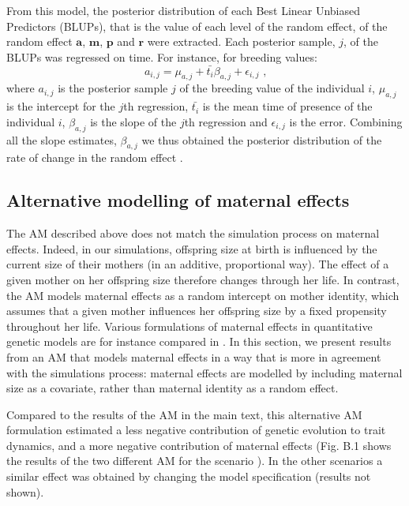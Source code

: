 From this model, the posterior distribution of each Best Linear Unbiased Predictors (BLUPs), that is the value of each level of the random effect, of the random effect $\boldsymbol{a}$, $\boldsymbol{m}$, $\boldsymbol{p}$ and $\boldsymbol{r}$ were extracted. 
Each posterior sample, $j$, of the BLUPs was regressed on time. For instance, for breeding values:
\begin{equation}
a_{i,j} = \mu_{a,j} + \bar{t_i} \beta_{a,j} + \epsilon_{i,j} \text{ ,}
\end{equation}
where $a_{i,j}$ is the posterior sample $j$ of the breeding value of the individual $i$, $\mu_{a,j}$ is the intercept for the $j$th regression, $\bar{t_i}$ is the mean time of presence of the individual $i$,  $\beta_{a,j}$ is the slope of the $j$th regression and  $\epsilon_{i,j}$ is the error. 
Combining all the slope estimates, $\beta_{a,j}$ we thus obtained the posterior distribution of the rate of change in the random effect \citep{Hadfield2010}.

\subsection{Alternative modelling of maternal effects}\label{app:am:newres}
The AM described above does not match the simulation process on maternal effects. Indeed, in our simulations, offspring size at birth is influenced by the current size of their mothers (in an additive, proportional way). The effect of a given mother on her offspring size therefore changes through her life. In contrast, the AM models maternal effects as a random intercept on mother identity, which assumes that a given mother influences her offspring size by a fixed propensity  throughout her life.
Various formulations of maternal effects in quantitative genetic models are for instance compared in \cite{Mcglothlin2014}. In this section, we present results from an AM that models maternal effects in a way that is more in agreement with the simulations process: maternal effects are modelled by including maternal size as a covariate, rather than maternal identity as a random effect.

Compared to the results of the AM in the main text, this alternative AM formulation estimated a less negative contribution of genetic evolution to trait dynamics, and a more negative contribution of maternal effects (Fig. B.1 shows the results of the two different AM for the scenario \sh). In the other scenarios a similar effect was obtained by changing the model specification (results not shown).

